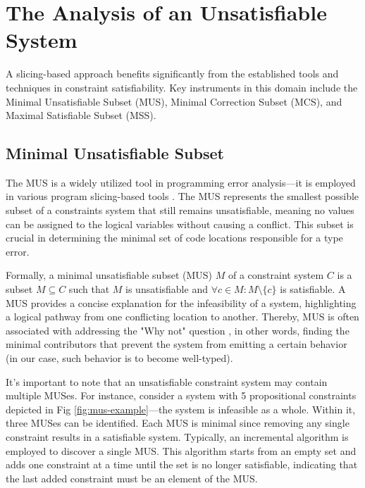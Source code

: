 \section{The Analysis of an Unsatisfiable System}

A slicing-based approach benefits significantly from the established tools and techniques in constraint satisfiability. Key instruments in this domain include the Minimal Unsatisfiable Subset (MUS), Minimal Correction Subset (MCS), and Maximal Satisfiable Subset (MSS).

\subsection{Minimal Unsatisfiable Subset}

The MUS is a widely utilized tool in programming error analysis—it is employed in various program slicing-based tools \cite{Haack2004-fr, Pavlinovic2015-ke, Stuckey2003-pz}. The MUS represents the smallest possible subset of a constraints system that still remains unsatisfiable, meaning no values can be assigned to the logical variables without causing a conflict. This subset is crucial in determining the minimal set of code locations responsible for a type error.


Formally, a minimal unsatisfiable subset (MUS) $M$ of a constraint system $C$ is a subset $M \subseteq C$ such that $M$ is unsatisfiable and $ \forall{c} \in M : M \setminus \{c\}$ is satisfiable.  A MUS provides a concise explanation for the infeasibility of a system, highlighting a logical pathway from one conflicting location to another. Thereby, MUS is often associated with addressing the "Why not" question \cite{Ignatiev2020-xu, Nelson2017-ar}, in other words, finding the minimal contributors that prevent the system from emitting a certain behavior (in our case, such behavior is to become well-typed).

It's important to note that an unsatisfiable constraint system may contain multiple MUSes. For instance, consider a system with 5 propositional constraints depicted in Fig \ref{fig:mus-example}—the system is infeasible as a whole. Within it, three MUSes can be identified. Each MUS is minimal since removing any single constraint results in a satisfiable system. Typically, an incremental algorithm is employed to discover a single MUS. This algorithm starts from an empty set and adds one constraint at a time until the set is no longer satisfiable, indicating that the last added constraint must be an element of the MUS. 

